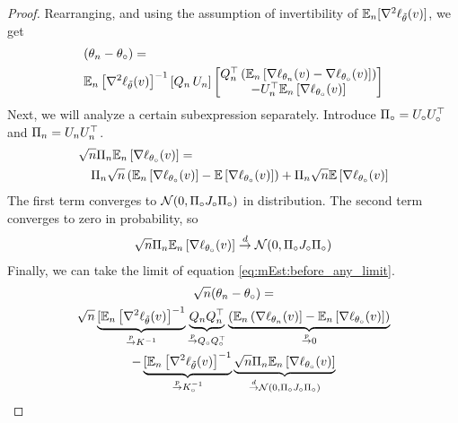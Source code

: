 \begin{proof}
    Rearranging, and using the assumption of invertibility of $\mathbb{E}_n [\nabla^2 \ell_{\tilde {\theta}}(v)]$, we get
    \begin{align}
        \label{eq:mEst:before_any_limit}
         & ( \theta_n - \theta_\circ)=                                                                            \\
         & \mathbb{E}_n \left[\nabla^2 \ell_{\tilde {\theta}}(v)\right]^{-1} [Q_n\,U_n]\begin{bmatrix}Q_n^\top \left(\mathbb{E}_n \left[ \nabla \ell_{ \theta_n}(v) -  \nabla \ell_{\theta_\circ}(v)\right] \right)  \\  -U_n^\top \mathbb{E}_n \left[ \nabla \ell_{\theta_\circ}(v)\right] \end{bmatrix}
    \end{align}
    Next, we will analyze a certain subexpression separately. Introduce $\Pi_\circ = U_\circ U_\circ^\top$ and $\Pi_n = U_nU_n^\top$.
    \begin{align}
         & \sqrt{n} \Pi_n \mathbb{E}_n \left[ \nabla \ell_{\theta_\circ}(v)\right] =                                                                                                                                                                                       \\
         & \quad \Pi_n \sqrt{n} \left( \mathbb{E}_n \left[ \nabla \ell_{\theta_\circ}(v)\right] - \mathbb{E} \left[ \nabla \ell_{\theta_\circ}(v)\right] \right) + \Pi_n \sqrt{n}  \mathbb{E} \left[ \nabla \ell_{\theta_\circ}(v)\right]
    \end{align}
    The first term converges to $\mathcal N(0,\Pi_\circ J_\circ\Pi_\circ)$ in distribution. The second term converges to zero in probability,  so
    \begin{align}
        \sqrt{n} \Pi_n \mathbb{E}_n \left[ \nabla \ell_{\theta_\circ}(v)\right] \overset{d}{\to} \mathcal N(0,\Pi_\circ J_\circ\Pi_\circ)
    \end{align}
    Finally, we can take the limit of equation \eqref{eq:mEst:before_any_limit}.
    {\footnotesize\begin{multline}
        \sqrt{n} ( \theta_n - \theta_\circ) = \\
        \sqrt{n}\underbrace{[\mathbb{E}_n \left[ \nabla^2 \ell_{\tilde {\theta}}(v)\right]^{-1}}_{\overset{p}{\to} K^{-1}}  \underbrace{Q_nQ_n^\top}_{\overset{p}{\to} Q_\circ Q_\circ^\top} \underbrace{\left(\mathbb{E}_n \left(\nabla \ell_{ \theta_n}(v)\right] - \mathbb{E}_n \left[\nabla \ell_{\theta_\circ}(v)\right] \right)}_{\overset{p}{\to} 0} \\
        -  \underbrace{[\mathbb{E}_n \left[ \nabla^2 \ell_{\tilde {\theta}}(v)\right]^{-1}}_{\overset{p}{\to} K_\circ^{-1}} \underbrace{ \sqrt{n} \Pi_n \mathbb{E}_n \left[ \nabla \ell_{\theta_\circ}(v)\right]}_{\overset{d}{\to} \mathcal N(0,\Pi_\circ J_\circ\Pi_\circ)}
    \end{multline}
    }


\end{proof}
